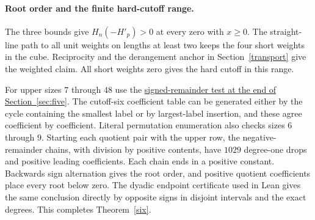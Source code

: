 \paragraph{Root order and the finite hard-cutoff range.}
The three bounds give \(H_n(-H'_p)>0\) at every zero with \(x\ge0\). The straight-line path to all unit weights on lengths at least two keeps the four short weights in the cube. Reciprocity and the derangement anchor in Section~\ref{transport} give the weighted claim. All short weights zero gives the hard cutoff in this range.

For upper sizes \(7\) through \(48\) use the \hyperref[five-signed-remainder]{signed-remainder test at the end of Section~\ref*{sec:five}}. The cutoff-six coefficient table can be generated either by the cycle containing the smallest label or by largest-label insertion, and these agree coefficient by coefficient. Literal permutation enumeration also checks sizes \(6\) through \(9\). Starting each quotient pair with the upper row, the negative-remainder chains, with division by positive contents, have \(1029\) degree-one drops and positive leading coefficients. Each chain ends in a positive constant. Backwards sign alternation gives the root order, and positive quotient coefficients place every root below zero. The dyadic endpoint certificate used in Lean gives the same conclusion directly by opposite signs in disjoint intervals and the exact degrees. This completes Theorem~\ref{six}.
